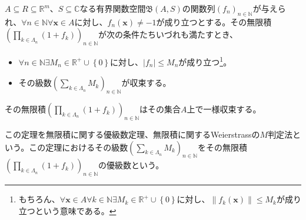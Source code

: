 \documentclass[dvipdfmx]{jsarticle}
\begin{document}
\begin{thm}\label{4.3.4.6}
$A \subseteq R \subseteq \mathbb{R}^{m}$、$S \subseteq \mathbb{C}$なる有界関数空間$\mathfrak{B}(A,S)$の関数列$\left( f_{n} \right)_{n \in \mathbb{N}}$が与えられ、$\forall n \in \mathbb{N}\forall\mathbf{x} \in A$に対し、$f_{n}\left( \mathbf{x} \right) \neq - 1$が成り立つとする。その無限積$\left( \prod_{k \in \varLambda_{n}} \left( 1 + f_{k} \right) \right)_{n \in \mathbb{N}}$が次の条件たちいづれも満たすとき、
\begin{itemize}
\item
  $\forall n \in \mathbb{N}\exists M_{n} \in \mathbb{R}^{+} \cup \left\{ 0 \right\}$に対し、$\left| f_{n} \right| \leq M_{n}$が成り立つ\footnote{もちろん、$\forall\mathbf{x} \in A\forall k \in \mathbb{N}\exists M_{k} \in \mathbb{R}^{+} \cup \left\{ 0 \right\}$に対し、$\left\| f_{k}\left( \mathbf{x} \right) \right\| \leq M_{k}$が成り立つという意味である。}。
\item
  その級数$\left( \sum_{k \in \varLambda_{n}} M_{k} \right)_{n \in \mathbb{N}}$が収束する。
\end{itemize}
その無限積$\left( \prod_{k \in \varLambda_{n}} \left( 1 + f_{k} \right) \right)_{n \in \mathbb{N}}$はその集合$A$上で一様収束する。\par
この定理を無限積に関する優級数定理、無限積に関するWeierstrassの$M$判定法という。この定理におけるその級数$\left( \sum_{k \in \varLambda_{n}} M_{k} \right)_{n \in \mathbb{N}}$をその無限積$\left( \prod_{k \in \varLambda_{n}} \left( 1 + f_{k} \right) \right)_{n \in \mathbb{N}}$の優級数という。
\end{thm}
\end{document}
